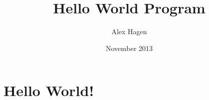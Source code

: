 \documentclass{article}
\title{Hello World Program}
\author{Alex Hagen}
\date{November 2013}
\begin{document}
  \maketitle
  \section{Hello World!}
  \lipsum[1-5]
\end{document}
